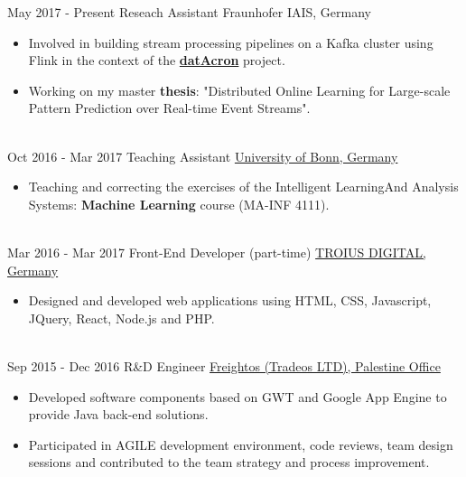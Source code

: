 \documentclass[letterpaper]{twentysecondcv} %
\begin{document}
\begin{twenty} %
	
	\twentyitem
	{May 2017 -}
	{Present}
	{Reseach Assistant}
	{\href{https://www.iais.fraunhofer.de/?L=1}{}}
	{Fraunhofer IAIS, Germany}
	{\begin{itemize}
			\item Involved in building stream processing pipelines on a Kafka cluster using Flink in the context of the \href{http://www.datacron-project.eu/}{\textbf{datAcron}} project.
			
			\item Working on my master \textbf{thesis}: "Distributed Online Learning for Large-scale Pattern Prediction over Real-time Event Streams".
	\end{itemize}}
\\
		\twentyitem
	{Oct 2016 - }
	{Mar 2017}
	{Teaching Assistant}
	{}
	{\href{https://www.kdml.iai.uni-bonn.de/teaching/winter-2016-17}{University of Bonn, Germany}}
	 {\begin{itemize}
			\item Teaching and correcting the exercises of the Intelligent Learning ​ And Analysis Systems:\textbf{ Machine Learning} course (MA-INF 4111).
	\end{itemize}}


        \\
	\twentyitem
    	{Mar 2016 -}
		{Mar 2017}
        {Front-End Developer (part-time)}
        {}
        {\href{https://twitter.com/TROIUS_DIGITAL}{TROIUS DIGITAL, Germany}}
        {
        {\begin{itemize}
        \item Designed and developed web applications using HTML, CSS, Javascript, JQuery, React, Node.js and PHP.
    \end{itemize}}
        }
    \\   
    \twentyitem
   		{Sep 2015 -}
		{Dec 2016}
        {R\&D Engineer}
        {}
        {\href{https://www.freightos.com/}{Freightos (Tradeos LTD), Palestine Office}}
        {
        {\begin{itemize}
        \item Developed software components based on GWT and Google App Engine to provide Java back-end solutions.
        \item Participated in AGILE development environment, code reviews, team design sessions and contributed to the team strategy and process improvement.
        

\end{itemize}}}
\end{twenty}
\end{document}
